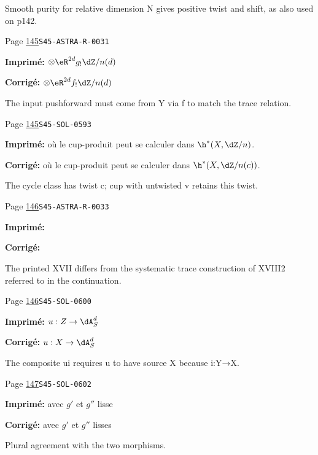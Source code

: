 \begin{description}
\par\noindent Smooth purity for relative dimension N gives positive twist and shift, as also used on p142.
\smallskip
\item[\hypertarget{apparatus:FR-0102}{102}] Page \hyperlink{printpage:fr:145}{145}\quad\texttt{S45-ASTRA-R-0031}
\par\noindent\textbf{Imprimé:} \(\otimes \eR^{2 d} g_!\dZ/n(d)\)
\par\noindent\textbf{Corrigé:} \(\otimes \eR^{2 d} f_!\dZ/n(d)\)
\par\noindent The input pushforward must come from Y via f to match the trace relation.
\smallskip
\item[\hypertarget{apparatus:FR-0103}{103}] Page \hyperlink{printpage:fr:145}{145}\quad\texttt{S45-SOL-0593}
\par\noindent\textbf{Imprimé:} où le cup-produit peut se calculer dans $\h^*(X,\dZ/n)$.
\par\noindent\textbf{Corrigé:} où le cup-produit peut se calculer dans $\h^*(X,\dZ/n(c))$.
\par\noindent The cycle class has twist c; cup with untwisted v retains this twist.
\smallskip
\item[\hypertarget{apparatus:FR-0104}{104}] Page \hyperlink{printpage:fr:146}{146}\quad\texttt{S45-ASTRA-R-0033}
\par\noindent\textbf{Imprimé:} 
\par\noindent\textbf{Corrigé:} 
\par\noindent The printed XVII differs from the systematic trace construction of XVIII2 referred to in the continuation.
\smallskip
\item[\hypertarget{apparatus:FR-0105}{105}] Page \hyperlink{printpage:fr:146}{146}\quad\texttt{S45-SOL-0600}
\par\noindent\textbf{Imprimé:} \(u:Z\to \dA_S^d\)
\par\noindent\textbf{Corrigé:} \(u:X\to \dA_S^d\)
\par\noindent The composite ui requires u to have source X because i:Y→X.
\smallskip
\item[\hypertarget{apparatus:FR-0106}{106}] Page \hyperlink{printpage:fr:147}{147}\quad\texttt{S45-SOL-0602}
\par\noindent\textbf{Imprimé:} avec $g'$ et $g''$ lisse
\par\noindent\textbf{Corrigé:} avec $g'$ et $g''$ lisses
\par\noindent Plural agreement with the two morphisms.

\end{description}

